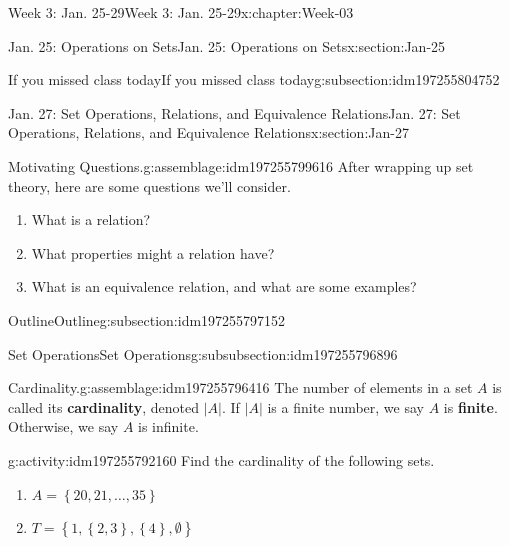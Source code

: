 \documentclass[oneside,10pt,]{book}
\newcommand{\terminology}[1]{\textbf{#1}}
\numberwithin{equation}{section}
\newcommand{\set}[1]{\left\{ {#1} \right\}}
\newcommand{\card}[1]{\left| #1 \right|}
\begin{document}
\begin{chapterptx}{Week 3: Jan. 25-29}{}{Week 3: Jan. 25-29}{}{}{x:chapter:Week-03}
\begin{sectionptx}{Jan. 25: Operations on Sets}{}{Jan. 25: Operations on Sets}{}{}{x:section:Jan-25}
\begin{subsectionptx}{If you missed class today}{}{If you missed class today}{}{}{g:subsection:idm197255804752}
\end{subsectionptx}
\end{sectionptx}
%
%
\typeout{************************************************}
\typeout{************************************************}
%
\begin{sectionptx}{Jan. 27: Set Operations, Relations, and Equivalence Relations}{}{Jan. 27: Set Operations, Relations, and Equivalence Relations}{}{}{x:section:Jan-27}
\begin{introduction}{}%
\begin{assemblage}{Motivating Questions.}{g:assemblage:idm197255799616}%
After wrapping up set theory, here are some questions we'll consider. %
\begin{enumerate}
\item{}What is a relation?%
\item{}What properties might a relation have?%
\item{}What is an equivalence relation, and what are some examples?%
\end{enumerate}
%
\end{assemblage}
\end{introduction}%
%
%
\typeout{************************************************}
\typeout{************************************************}
%
\begin{subsectionptx}{Outline}{}{Outline}{}{}{g:subsection:idm197255797152}
%
%
\typeout{************************************************}
\typeout{************************************************}
%
\begin{subsubsectionptx}{Set Operations}{}{Set Operations}{}{}{g:subsubsection:idm197255796896}
\begin{assemblage}{Cardinality.}{g:assemblage:idm197255796416}%
The number of elements in a set \(A\) is called its \terminology{cardinality}, denoted \(\card{A}\). If \(\card{A}\) is a finite number, we say \(A\) is \terminology{finite}. Otherwise, we say \(A\) is infinite.%
\end{assemblage}
\begin{activity}{}{g:activity:idm197255792160}%
Find the cardinality of the following sets.%
%
\begin{enumerate}
\item{}\(\displaystyle A=\set{20, 21, \ldots, 35}\)%
\item{}\(\displaystyle T = \set{1,\set{2,3},\set{4},\emptyset}\)%

\end{enumerate}
\end{activity}
\end{subsubsectionptx}
\end{subsectionptx}
\end{sectionptx}
\end{chapterptx}
\end{document}
